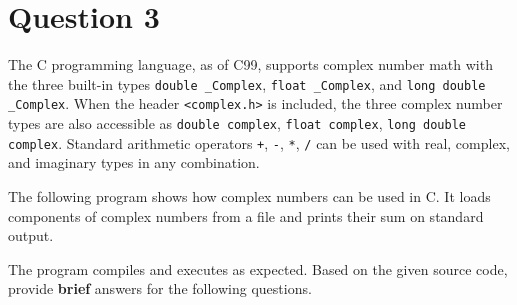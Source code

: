 
\section*{Question 3}

The C programming language, as of C99, supports complex number math with the three built-in types \texttt{double \_Complex}, \texttt{float \_Complex}, and \texttt{long double \_Complex}.
When the header \texttt{<complex.h>} is included, the three complex number types are also accessible as \texttt{double complex}, \texttt{float complex}, \texttt{long double complex}.
Standard arithmetic operators \texttt{+}, \texttt{-}, \texttt{*}, \texttt{/} can be used with real, complex, and imaginary types in any combination.

The following program shows how complex numbers can be used in C. It loads components of complex numbers from a file and prints their sum on standard output.

\lstset{language=c,tabsize=4}



The program compiles and executes as expected.
Based on the given source code, provide \textbf{brief} answers for the following questions.

